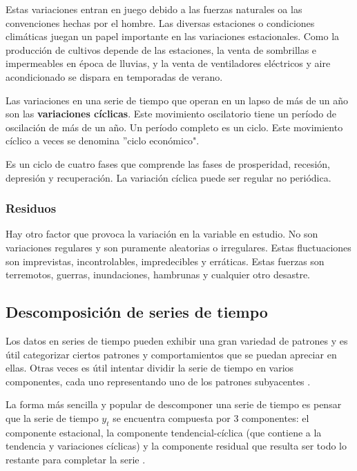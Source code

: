     Estas variaciones entran en juego debido a las fuerzas naturales oa las convenciones hechas por el hombre. Las diversas estaciones o condiciones climáticas juegan un papel 
    importante en las variaciones estacionales. Como la producción de cultivos depende de las estaciones, la venta de sombrillas e impermeables en época de lluvias, 
    y la venta de ventiladores eléctricos y aire acondicionado se dispara en temporadas de verano.

    Las variaciones en una serie de tiempo que operan en un lapso de más de un año son las \textbf{variaciones cíclicas}. Este movimiento oscilatorio tiene un período de oscilación de más de un año.
    Un período completo es un ciclo. Este movimiento cíclico a veces se denomina ''ciclo económico".

    Es un ciclo de cuatro fases que comprende las fases de prosperidad, recesión, depresión y recuperación. La variación cíclica puede ser regular no periódica.

    \subsubsection{Residuos}
    
    Hay otro factor que provoca la variación en la variable en estudio. No son variaciones regulares y son puramente aleatorias o irregulares. 
    Estas fluctuaciones son imprevistas, incontrolables, impredecibles y erráticas. Estas fuerzas son terremotos, guerras, inundaciones, hambrunas y cualquier otro desastre.

    \subsection{Descomposición de series de tiempo}
    Los datos en series de tiempo pueden exhibir una gran variedad de patrones y es útil categorizar ciertos patrones 
    y comportamientos que se puedan apreciar en ellas. Otras veces es útil intentar dividir la serie de tiempo en varios componentes,
    cada uno representando uno de los patrones subyacentes \cite{20}.

    La forma más sencilla y popular de descomponer una serie de tiempo es pensar que la serie de tiempo $y_t$ se encuentra compuesta por 
    3 componentes: el componente estacional, la componente tendencial-cíclica (que contiene a la tendencia y variaciones cíclicas) y la componente residual que resulta ser
    todo lo restante para completar la serie \cite{20}.


